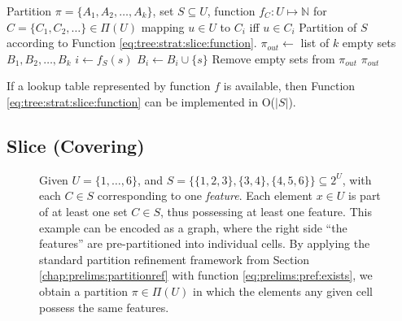 			\begin{algorithm}[ht!]
				\centering
				\begin{algorithmic}
					\Require Partition $\pi = \{ A_1, A_2, \ldots, A_k \}$, set $S \subseteq U$, function $f_C: U \mapsto \mathbb{N}$ for $C = \{ C_1, C_2, \ldots \} \in \Pi(U)$ mapping $u \in U$ to $C_i$ iff $u \in C_i$
					\Ensure Partition of $S$ according to Function \ref{eq:tree:strat:slice:function}.
					\Statex
						\State $\pi_{out} \gets$ list of $k$ empty sets $B_1, B_2, \ldots, B_k$
							\State $i \gets f_S(s)$
							\State $B_i \gets B_i \cup \{ s \}$
						\EndFor
						\State Remove empty sets from $\pi_{out}$
						\State \Return $\pi_{out}$
					\EndFunction
				\end{algorithmic}
				\caption{If a lookup table represented by function $f$ is available, then Function \ref{eq:tree:strat:slice:function} can be implemented in O($|S|$).}
				\label{algo:tree:strat:slice}
			\end{algorithm}
			
			\FloatBarrier
			\clearpage
		
		\subsection{Slice (Covering)}
		
			\begin{figure}[ht!]
				\centering
				
				\caption{Given $U = \{ 1, \ldots, 6 \}$, and $S = \{ \{ 1, 2, 3 \}, \{ 3, 4 \}, \{ 4, 5, 6 \} \} \subseteq 2^U$, with each $C \in S$ corresponding to one \textit{feature}.
				Each element $x \in U$ is part of at least one set $C \in S$, thus possessing at least one feature.
				This example can be encoded as a graph, where the right side \enquote{the features} are pre-partitioned into individual cells. By applying the standard partition refinement framework from Section \ref{chap:prelims:partitionref} with function \ref{eq:prelims:pref:exists}, we obtain a partition $\pi \in \Pi(U)$ in which the elements any given cell possess the same features.} 
				\label{fig:tree:strat:cov}
			\end{figure}
			
